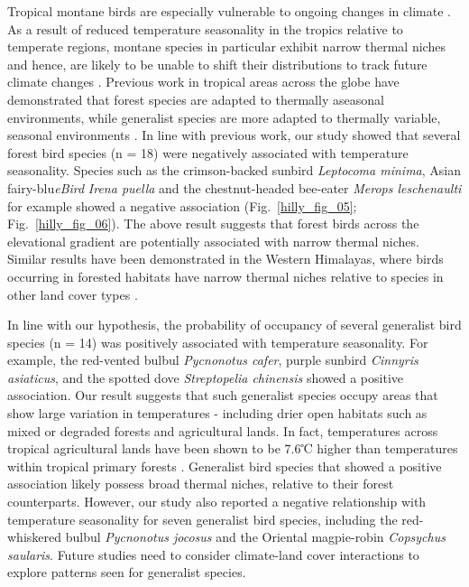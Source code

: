 Tropical montane birds are especially vulnerable to ongoing changes in climate \citep{sekercioglu2007,perez2016,freeman2018,srinivasan2018}.
As a result of reduced temperature seasonality in the tropics relative to temperate regions, montane species in particular exhibit narrow thermal niches and hence, are likely to be unable to shift their distributions to track future climate changes \citep{janzen1967,deutsch2008,tewksbury2008,jankowski2013}.
Previous work in tropical areas across the globe have demonstrated that forest species are adapted to thermally aseasonal environments, while generalist species are more adapted to thermally variable, seasonal environments \citep{frishkoff2016,chan2016}.
In line with previous work, our study showed that several forest bird species (n = 18) were negatively associated with temperature seasonality.
Species such as the crimson-backed sunbird \textit{Leptocoma minima}, Asian fairy-blu\textit{eBird} \textit{Irena puella} and the chestnut-headed bee-eater \textit{Merops leschenaulti} for example showed a negative association (Fig.~\ref{hilly_fig_05}; Fig.~\ref{hilly_fig_06}).
The above result suggests that forest birds across the elevational gradient are potentially associated with narrow thermal niches.
Similar results have been demonstrated in the Western Himalayas, where birds occurring in forested habitats have narrow thermal niches relative to species in other land cover types \citep{srinivasan2019}.

In line with our hypothesis, the probability of occupancy of several generalist bird species (n = 14) was positively associated with temperature seasonality.
For example, the red-vented bulbul \textit{Pycnonotus cafer}, purple sunbird \textit{Cinnyris asiaticus}, and the spotted dove \textit{Streptopelia chinensis} showed a positive association.
Our result suggests that such generalist species occupy areas that show large variation in temperatures - including drier open habitats such as mixed or degraded forests and agricultural lands.
In fact, temperatures across tropical agricultural lands have been shown to be 7.6℃ higher than temperatures within tropical primary forests \citep{senior2017}.
Generalist bird species that showed a positive association likely possess broad thermal niches, relative to their forest counterparts.
However, our study also reported a negative relationship with temperature seasonality for seven generalist bird species, including the red-whiskered bulbul \textit{Pycnonotus jocosus} and the Oriental magpie-robin \textit{Copsychus saularis}.
Future studies need to consider climate-land cover interactions to explore patterns seen for generalist species.

